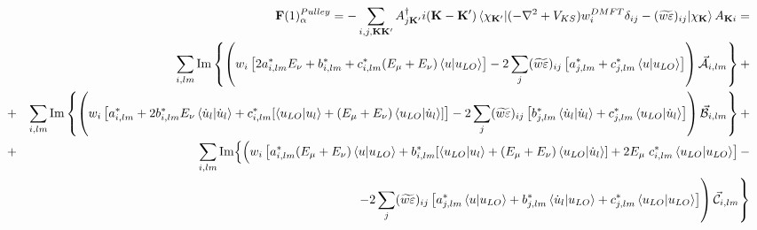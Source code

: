 \documentclass[aps,prb,floatfix,epsfig,singlecolumn,showpacs,preprintnumbers]{revtex4}
\newcommand{\vF}{{\mathbf{F}}}
\newcommand{\vK}{{\mathbf{K}}}
\renewcommand{\Im}{\textrm{Im}}
\newcommand{\vcA}{\vec{\cal A}}
\newcommand{\vcB}{\vec{\cal B}}
\newcommand{\vcC}{\vec{\cal C}}
\begin{document}
{
\small
\begin{eqnarray}
&&\vF(1)^{Pulley}_\alpha= 
 -\sum_{i,j,\vK\vK'} A_{j\vK'}^{\dagger}  i(\vK-\vK')\braket{\chi_{\vK'}|(-\nabla^2+V_{KS}) w^{DMFT}_i\delta_{ij}-(\widetilde{w\varepsilon})_{ij}|\chi_\vK}  A_{\vK i}=
\nonumber\\
&& \sum_{i,lm} \Im\left\{
\left(
w_i \left[ 2 a_{i,lm}^* E_\nu + b_{i,lm}^* +   c^*_{i,lm} (E_{\mu}+E_\nu)  \braket{u|u_{LO}} \right]
-2\sum_{j} (\widetilde{w\varepsilon})_{ij}
\left [a_{j,lm}^*  + c^*_{j,lm} \braket{u|u_{LO}}\right]
\right)\vcA_{i,lm}
\right\}+
%
\nonumber\\
&+& \sum_{i,lm}\Im\left\{
\left(
w_i\left[
a_{i,lm}^* +2 b_{i,lm}^* E_\nu \braket{\dot{u}_l|\dot{u}_l} +c^*_{i,lm}  [ \braket{u_{LO}|u_l}  + (E_\mu+E_\nu)\braket{u_{LO}|\dot{u}_l} ]
\right]
-2\sum_j (\widetilde{w\varepsilon})_{ij}
\left[ b_{j,lm}^* \braket{\dot{u}_l|\dot{u}_l} +c^*_{j,lm}  \braket{u_{LO}|\dot{u}_l} \right] 
\right)\vcB_{i,lm}
\right\}+
\nonumber\\
&+& \sum_{i,lm}\Im\Bigl\{
\Bigl( 
w_i \left[
a^*_{i,lm} (E_{\mu}+E_\nu) \braket{u|u_{LO}} + b^*_{i,lm} [\braket{u_{LO}|u_l} + (E_\mu+E_\nu)\braket{u_{LO}|\dot{u}_l} ]+ 2  E_\mu\; c^*_{i,lm}\braket{u_{LO}|u_{LO}}
\right]
-\Bigr.
\Bigr.\nonumber\\
&&\qquad\qquad\qquad\qquad\qquad\qquad
\left.
\left.
-2\sum_j (\widetilde{w\varepsilon})_{ij}
\left[a^*_{j,lm}\braket{u|u_{LO}} + b^*_{j,lm} \braket{\dot{u}_l|u_{LO}}  +c^*_{j,lm} \braket{u_{LO}|u_{LO}} \right]
\right)\vcC_{i,lm} 
\right\}
\end{eqnarray}
}
% 
% 
\end{document}
